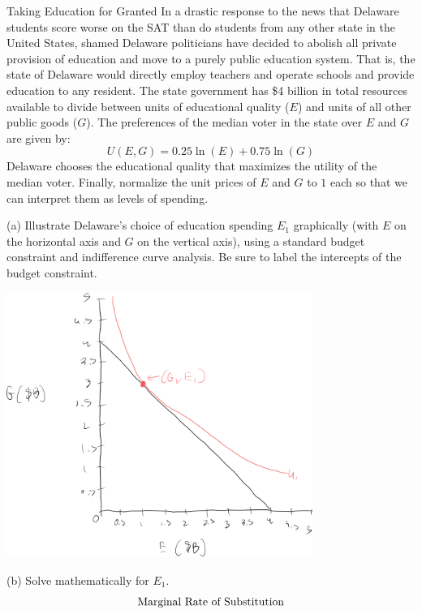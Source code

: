 \documentclass[8pt]{extarticle}
\begin{document}
  \begin{problem}{Taking Education for Granted}
    In a drastic response to the news that Delaware students score worse on the SAT than do students from any other state in the United States, shamed Delaware politicians have decided to abolish all private provision of education and move to a purely public education system. That is, the state of Delaware would directly employ teachers and operate schools and provide education to any resident. The state government has \$4 billion in total resources available to divide between units of educational quality ($E$) and units of all other public goods ($G$). The preferences of the median voter in the state over $E$ and $G$ are given by:
    \[
      U(E,G) = 0.25\ln(E) + 0.75\ln(G)
    \] 
    Delaware chooses the educational quality that maximizes the utility of the median voter. Finally, normalize the unit prices of $E$ and $G$ to $1$ each so that we can interpret them as levels of spending.
    \tcblower
    \begin{problem}{(a)}
      Illustrate Delaware's choice of education spending $E_1$ graphically (with $E$ on the horizontal axis and $G$ on the vertical axis), using a standard budget constraint and indifference curve analysis. Be sure to label the intercepts of the budget constraint.
      \tcblower
      \begin{center}
        \includegraphics[width=0.75\textwidth]{images/3_4_a.png}
      \end{center}
    \end{problem}
    \begin{problem}{(b)}
      Solve mathematically for $E_1$.
      \tcblower
      \begin{align*}
        \shortintertext{Marginal Rate of Substitution}

\end{align*}
\end{problem}
\end{problem}
\end{document}
